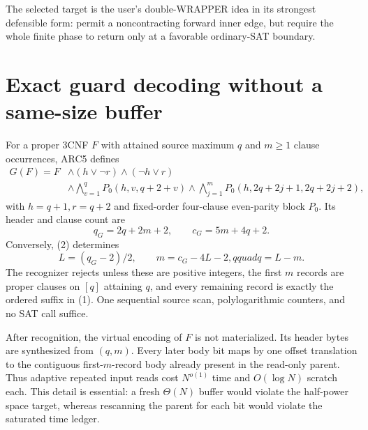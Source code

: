 \documentclass[11pt]{article}
\begin{document}
The selected target is the user's double-WRAPPER idea in its strongest
defensible form: permit a noncontracting forward inner edge, but require the
whole finite phase to return only at a favorable ordinary-SAT boundary.

\section{Exact guard decoding without a same-size buffer}
For a proper 3CNF $F$ with attained source maximum $q$ and $m\ge1$ clause
occurrences, ARC5 defines
\begin{equation}
\begin{split}
G(F)=F&\wedge(h\vee\neg r)\wedge(\neg h\vee r)\\
&\wedge\bigwedge_{v=1}^{q}P_0(h,v,q+2+v)
 \wedge\bigwedge_{j=1}^{m}P_0(h,2q+2j+1,2q+2j+2),
\end{split}
\tag{1}
\end{equation}
with $h=q+1,r=q+2$ and fixed-order four-clause even-parity block $P_0$.
Its header and clause count are
\begin{equation}
 q_G=2q+2m+2,\qquad c_G=5m+4q+2.                         \tag{2}
\end{equation}
Conversely, (2) determines
\begin{equation}
 L=(q_G-2)/2,\qquad m=c_G-4L-2,qquad q=L-m.              \tag{3}
\end{equation}
The recognizer rejects unless these are positive integers, the first $m$
records are proper clauses on $[q]$ attaining $q$, and every remaining
record is exactly the ordered suffix in (1).  One sequential source scan,
polylogarithmic counters, and no SAT call suffice.

After recognition, the virtual encoding of $F$ is not materialized.  Its
header bytes are synthesized from $(q,m)$.  Every later body bit maps by one
offset translation to the contiguous first-$m$-record body already present
in the read-only parent.  Thus adaptive repeated input reads cost
$N^{o(1)}$ time and $O(\log N)$ scratch each.  This detail is essential: a
fresh $\Theta(N)$ buffer would violate the half-power space target, whereas
rescanning the parent for each bit would violate the saturated time ledger.
\end{document}
